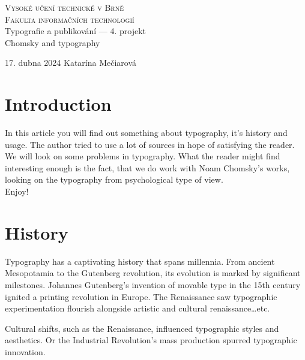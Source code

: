 \documentclass[11pt]{article}
\begin{document}
    \begin{titlepage}
        \begin{center}
            \Huge\textsc{Vysoké učení technické v Brně}\\
            \huge\textsc{Fakulta informačních technologií}\\
            {Typografie a publikování –– 4. projekt}\\
            {Chomsky and typography}

        \end{center}
        {\LARGE 17. dubna 2024 \hfill
        Katarína Mečiarová}

    \end{titlepage}

    \tableofcontents
    \renewcommand{\cftsecleader}{\cftdotfill{\cftdotsep}}
    \setlength{\cftbeforesecskip}{0.5em}

    \newpage

    \section{Introduction}
    In this article you will find out something about typography, it's history and usage.
    The author tried to use a lot of sources in hope of satisfying the reader. \\
    We will look on some problems in typography. What the reader might find interesting enough
    is the fact, that we do work with Noam Chomsky's works, looking on the typography
    from psychological type of view. \\ Enjoy!

    \section{History}
    Typography has a captivating history that spans millennia.
    From ancient Mesopotamia to the Gutenberg revolution, its evolution is marked by significant milestones.
    Johannes Gutenberg's invention of movable type in the 15th century ignited a printing revolution in Europe.
    The Renaissance saw typographic experimentation flourish alongside artistic and cultural renaissance\ldots etc.

    Cultural shifts, such as the Renaissance, influenced typographic styles and aesthetics.
    Or the Industrial Revolution's mass production spurred typographic innovation.
\end{document}
